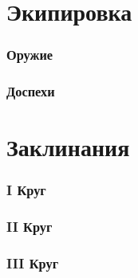 \part{Экипировка}
\section{Оружие}
\section{Доспехи}

\clearpage
\part{Заклинания}
\section{\textrm{I} Круг}
\section{\textrm{II} Круг}
\section{\textrm{III} Круг}



